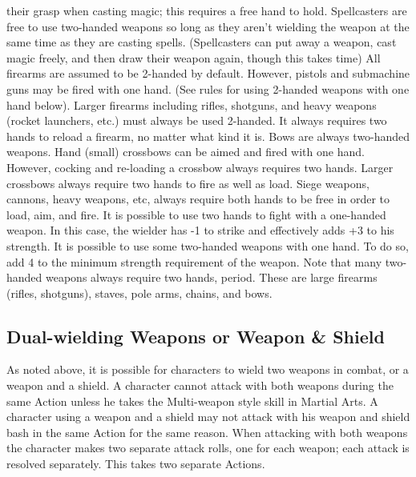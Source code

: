 \documentclass[twoside]{book}
\begin{document}
               their grasp when casting magic; this requires a free hand
               to hold. Spellcasters are free to use two-handed weapons
               so long as they aren’t wielding the weapon at the
               same time as they are casting spells. (Spellcasters can
               put away a weapon, cast magic freely, and then draw their
               weapon again, though this takes time)  All firearms are assumed to be 2-handed by default.
               However, pistols and submachine guns may be fired with one
               hand. (See rules for using 2-handed weapons with one hand
               below). Larger firearms including rifles, shotguns, and
               heavy weapons (rocket launchers, etc.) must always be used
               2-handed. It always requires two hands to reload a
               firearm, no matter what kind it is.  Bows are always two-handed weapons. Hand (small)
               crossbows can be aimed and fired with one hand. However,
               cocking and re-loading a crossbow always requires two
               hands. Larger crossbows always require two hands to fire
               as well as load. Siege weapons, cannons, heavy weapons,
               etc, always require both hands to be free in order to
               load, aim, and fire.  It is possible to use two hands to fight with a
               one-handed weapon. In this case, the wielder has -1 to
               strike and effectively adds +3 to his strength.  It is possible to use some two-handed weapons with
               one hand. To do so, add 4 to the minimum strength
               requirement of the weapon. Note that many two-handed
               weapons always require two hands, period. These are large
               firearms (rifles, shotguns), staves, pole arms, chains,
               and bows. 
\subsection{Dual-wielding Weapons or Weapon \& Shield}
     As noted above, it is possible for characters to
               wield two weapons in combat, or a weapon and a shield. A
               character cannot attack with both weapons during the same
               Action unless he takes the Multi-weapon style skill in
               Martial Arts. A character using a weapon and a shield may
               not attack with his weapon and shield bash in the same
               Action for the same reason. When attacking with both
               weapons the character makes two separate attack rolls, one
               for each weapon; each attack is resolved separately. This
               takes two separate Actions.   
                
\end{document}
